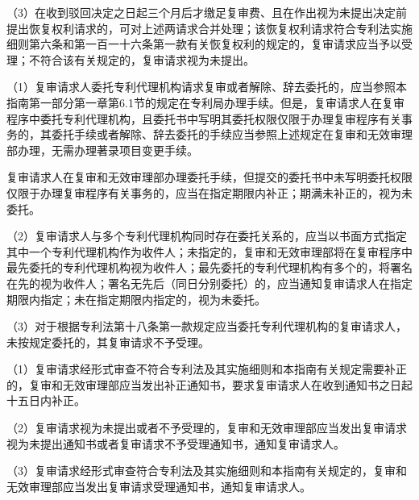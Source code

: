 {\setlength{\parindent}{17.1bp}（3）在收到驳回决定之日起三个月后才缴足复审费、且在作出视为未提出决定前提出恢复权利请求的，可对上述两请求合并处理；该恢复权利请求符合专利法实施细则第六条和第一百一十六条第一款有关恢复权利的规定的，复审请求应当予以受理；不符合该有关规定的，复审请求视为未提出。\par}

{\setlength{\parindent}{17.1bp}（1）复审请求人委托专利代理机构请求复审或者解除、辞去委托的，应当参照本指南第一部分第一章第6.1节的规定在专利局办理手续。但是，复审请求人在复审程序中委托专利代理机构，且委托书中写明其委托权限仅限于办理复审程序有关事务的，其委托手续或者解除、辞去委托的手续应当参照上述规定在复审和无效审理部办理，无需办理著录项目变更手续。\par}

复审请求人在复审和无效审理部办理委托手续，但提交的委托书中未写明委托权限仅限于办理复审程序有关事务的，应当在指定期限内补正；期满未补正的，视为未委托。

{\setlength{\parindent}{17.1bp}（2）复审请求人与多个专利代理机构同时存在委托关系的，应当以书面方式指定其中一个专利代理机构作为收件人；未指定的，复审和无效审理部将在复审程序中最先委托的专利代理机构视为收件人；最先委托的专利代理机构有多个的，将署名在先的视为收件人；署名无先后（同日分别委托）的，应当通知复审请求人在指定期限内指定；未在指定期限内指定的，视为未委托。\par}

{\setlength{\parindent}{17.1bp}（3）对于根据专利法第十八条第一款规定应当委托专利代理机构的复审请求人，未按规定委托的，其复审请求不予受理。\par}

{\setlength{\parindent}{17.1bp}（1）复审请求经形式审查不符合专利法及其实施细则和本指南有关规定需要补正的，复审和无效审理部应当发出补正通知书，要求复审请求人在收到通知书之日起十五日内补正。\par}

{\setlength{\parindent}{17.1bp}（2）复审请求视为未提出或者不予受理的，复审和无效审理部应当发出复审请求视为未提出通知书或者复审请求不予受理通知书，通知复审请求人。\par}

{\setlength{\parindent}{17.1bp}（3）复审请求经形式审查符合专利法及其实施细则和本指南有关规定的，复审和无效审理部应当发出复审请求受理通知书，通知复审请求人。\par}

